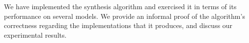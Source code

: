 
We have implemented the synthesis
algorithm and exercised it in terms of its performance on several models. We
provide an informal proof of the algorithm's correctness regarding the
implementations that it produces, and discuss our experimental results.

\fi

